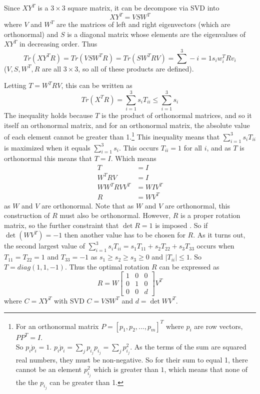\documentclass[12pt,a4paper]{article}
\begin{document}
    Since $XY^T$ is a $3 \times 3$ square matrix, it can be decompose via SVD into
    \[
    XY^T = VSW^T
    \]
    where $V$ and $W^T$ are the matrices of left and right eigenvectors (which are orthonormal) and $S$ is a diagonal matrix whose elements are the eigenvalues of $XY^T$ in decreasing order. Thus
    \[
    Tr(XY^TR) = Tr(VSW^TR) = Tr(SW^TRV) = \sum^3-{i=1} s_i w_i^T R v_i
    \]
    ($V,S,W^T,R$ are all $3 \times 3$, so all of these products are defined). 
     
    Letting $T= W^TRV$, this can be written as
    \[
    Tr(X^TR) = \sum^3_{i=1} s_i T_{ii} \leq \sum^3_{i=1} s_i
    \]
    The inequality holds because $T$ is the product of orthonormal matrices, and so it itself an orthonormal matrix, and for an orthonormal matrix, the absolute value of each element cannot be greater than 1.\footnote{For an orthonormal matrix $P = [p_1, p_2, ..., p_m]^T$ where $p_i$ are row vectors, $PP^T = I$. \\
    So $p_i \dot p_i =1$. $p_i \dot p_i = \sum_j p_{i_j}p_{i_j} = \sum_j p_{i_j}^2$. As the terms of the sum are squared real numbers, they must be non-negative. So for their sum to equal 1, there cannot be an element $p_{i_j}^2$ which is greater than $1$, which means that none of the the $p_{i_j}$ can be greater than 1.} This inequality means that $\sum^3_{i=1} s_i T_{ii}$ is maximized when it equals $\sum^3_{i=1} s_i$. This occurs $T_{ii} =1$ for all $i$, and as $T$ is orthonormal this means that $T=I$. Which means
    \begin{align*}
    T &= I \\
    W^TRV &= I \\
    WW^TRVV^T &= WIV^T \\
    R &= WV^T
    \end{align*}
    as $W$ and $V$ are orthonormal. Note that as $W$ and $V$ are orthonormal, this construction of $R$ must also be orthonormal. However, $R$ is a proper rotation matrix, so the further constraint that $\det R = 1$ is imposed \cite{kavraki2009geometric}. So if $\det (WV^T) = -1$ then another value has to be chosen for $R$. As it turns out, the second largest value of $\sum^3_{i=1} s_i T_{ii} = s_1T_{11} + s_2T_{22} + s_3T_{33}$ occurs when $T_{11}=T_{22} = 1$ and $T_{33}=-1$ as $s_1 \geq s_2 \geq s_3 \geq 0$ and $|T_{ii}|\leq 1$. So $T = diag(1,1,-1)$. Thus the optimal rotation $R$ can be expressed as
    \[
    R = W \begin{bmatrix} 1 & 0 & 0 \\ 0 & 1 & 0 \\ 0 & 0 & d \end{bmatrix} V^T
    \]
    where $C = XY^T$ with SVD $C= VSW^T$ and $d = \det WV^T$.
\end{document}
